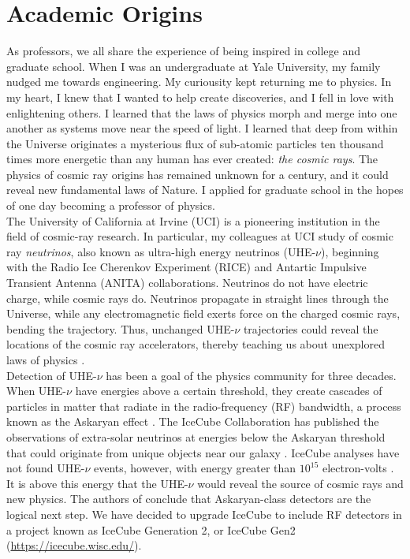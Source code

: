 \documentclass[../../main.tex]{subfiles}
\begin{document}
\section{Academic Origins}
\label{sec:origin}

As professors, we all share the experience of being inspired in college and graduate school.  When I was an undergraduate at Yale University, my family nudged me towards engineering.  My curiousity kept returning me to physics.  In my heart, I knew that I wanted to help create discoveries, and I fell in love with enlightening others.  I learned that the laws of physics morph and merge into one another as systems move near the speed of light.  I learned that deep from within the Universe originates a mysterious flux of sub-atomic particles ten thousand times more energetic than any human has ever created: \textit{the cosmic rays}.  The physics of cosmic ray origins has remained unknown for a century, and it could reveal new fundamental laws of Nature.  I applied for graduate school in the hopes of one day becoming a professor of physics.
\\
\vspace{0.15cm}
The University of California at Irvine (UCI) is a pioneering institution in the field of cosmic-ray research.  In particular, my colleagues at UCI study of cosmic ray \textit{neutrinos}, also known as ultra-high energy neutrinos (UHE-$\nu$), beginning with the Radio Ice Cherenkov Experiment (RICE) \cite{PhysRevD.85.062004} and Antartic Impulsive Transient Antenna (ANITA) \cite{PhysRevD.99.122001} collaborations. Neutrinos do not have electric charge, while cosmic rays do.  Neutrinos propagate in straight lines through the Universe, while any electromagnetic field exerts force on the charged cosmic rays, bending the trajectory.  Thus, unchanged UHE-$\nu$ trajectories could reveal the locations of the cosmic ray accelerators, thereby teaching us about unexplored laws of physics\cite{Astro2020_1} \cite{Astro2020_2} \cite{PhysRevD.83.113009}.
\\
\vspace{0.15cm}
Detection of UHE-$\nu$ has been a goal of the physics community for three decades.  When UHE-$\nu$ have energies above a certain threshold, they create cascades of particles in matter that radiate in the radio-frequency (RF) bandwidth, a process known as the Askaryan effect \cite{ask1} \cite{ask2} \cite{PhysRevLett.86.2802} \cite{PhysRevLett.99.171101} \cite{PhysRevD.101.083005}.  The IceCube Collaboration has published the observations of extra-solar neutrinos at energies below the Askaryan threshold that could originate from unique objects near our galaxy \cite{PhysRevLett.111.021103}.  IceCube analyses have not found UHE-$\nu$ events, however, with energy greater than $10^{15}$ electron-volts \cite{PhysRevD.98.062003}.  It is above this energy that the UHE-$\nu$ would reveal the source of cosmic rays and new physics.  The authors of \cite{PhysRevD.98.062003} conclude that Askaryan-class detectors are the logical next step.  We have decided to upgrade IceCube to include RF detectors in a project known as IceCube Generation 2, or IceCube Gen2 (\url{https://icecube.wisc.edu/}).
\end{document}
